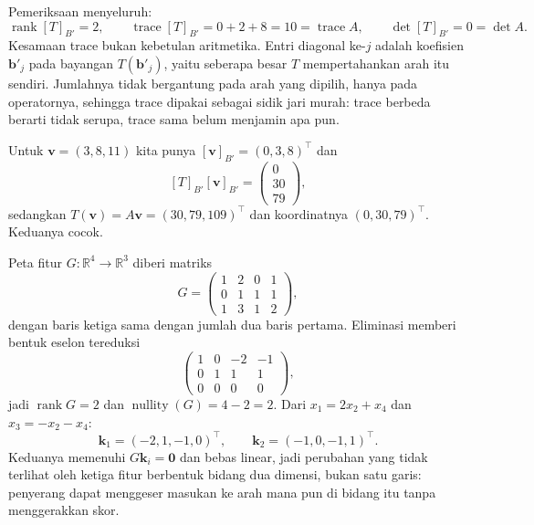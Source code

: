 Pemeriksaan menyeluruh:
\[
  \operatorname{rank}[T]_{B'}=2,\qquad \operatorname{trace}[T]_{B'}=0+2+8=10=\operatorname{trace}A,
  \qquad \det[T]_{B'}=0=\det A .
\]
Kesamaan trace bukan kebetulan aritmetika. Entri diagonal ke-$j$ adalah koefisien
$\mathbf{b}'_{j}$ pada bayangan $T(\mathbf{b}'_{j})$, yaitu seberapa besar $T$
mempertahankan
arah itu sendiri. Jumlahnya tidak bergantung pada arah yang dipilih, hanya pada operatornya,
sehingga trace dipakai sebagai sidik jari murah: trace berbeda berarti tidak serupa, trace
sama
belum menjamin apa pun.

Untuk $\mathbf{v}=(3,8,11)$ kita punya $[\mathbf{v}]_{B'}=(0,3,8)^{\top}$ dan
\[
  [T]_{B'}[\mathbf{v}]_{B'}=\begin{pmatrix}0\\30\\79\end{pmatrix},
\]
sedangkan $T(\mathbf{v})=A\mathbf{v}=(30,79,109)^{\top}$ dan koordinatnya
$(0,30,79)^{\top}$. Keduanya cocok.

Peta fitur $G\colon\mathbb{R}^{4}\to\mathbb{R}^{3}$
diberi matriks
\[
  G=\begin{pmatrix}1&2&0&1\\ 0&1&1&1\\ 1&3&1&2\end{pmatrix},
\]
dengan baris ketiga sama dengan jumlah dua baris pertama. Eliminasi memberi bentuk eselon
tereduksi
\[
  \begin{pmatrix}1&0&-2&-1\\ 0&1&1&1\\ 0&0&0&0\end{pmatrix},
\]
jadi $\operatorname{rank}G=2$ dan $\operatorname{nullity}(G)=4-2=2$. Dari
$x_{1}=2x_{2}+x_{4}$ dan $x_{3}=-x_{2}-x_{4}$:
\[
  \mathbf{k}_{1}=(-2,1,-1,0)^{\top},\qquad \mathbf{k}_{2}=(-1,0,-1,1)^{\top}.
\]
Keduanya memenuhi $G\mathbf{k}_{i}=\mathbf{0}$ dan bebas linear, jadi perubahan yang tidak
terlihat oleh ketiga fitur berbentuk bidang dua dimensi, bukan satu garis: penyerang dapat
menggeser masukan ke arah mana pun di bidang itu tanpa menggerakkan skor.


